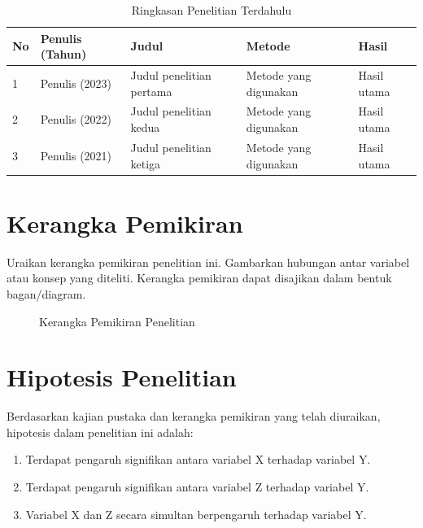 \begin{table}[H]
\caption{Ringkasan Penelitian Terdahulu}
\label{tab:penelitian-terdahulu}
\begin{isitable}
\begin{tabular}{p{0.5cm} p{3cm} p{4cm} p{4cm} p{2.5cm}}
\toprule
\textbf{No} & \textbf{Penulis (Tahun)} & \textbf{Judul} & \textbf{Metode} & \textbf{Hasil} \\
\midrule
1 & Penulis (2023) & Judul penelitian pertama & Metode yang digunakan & Hasil utama \\
2 & Penulis (2022) & Judul penelitian kedua & Metode yang digunakan & Hasil utama \\
3 & Penulis (2021) & Judul penelitian ketiga & Metode yang digunakan & Hasil utama \\
\bottomrule
\end{tabular}
\end{isitable}
\end{table}

\section{Kerangka Pemikiran}
\label{sec:kerangka-pemikiran}

Uraikan kerangka pemikiran penelitian ini. Gambarkan hubungan antar variabel atau
konsep yang diteliti. Kerangka pemikiran dapat disajikan dalam bentuk bagan/diagram.

\begin{figure}[H]
\centering
\caption{Kerangka Pemikiran Penelitian}
\label{fig:kerangka-pemikiran}
\end{figure}

\section{Hipotesis Penelitian}
\label{sec:hipotesis}

Berdasarkan kajian pustaka dan kerangka pemikiran yang telah diuraikan, hipotesis
dalam penelitian ini adalah:

\begin{enumerate}
  \item[\textbf{H\textsubscript{1}}:] Terdapat pengaruh signifikan antara variabel X terhadap variabel Y.
  \item[\textbf{H\textsubscript{2}}:] Terdapat pengaruh signifikan antara variabel Z terhadap variabel Y.
  \item[\textbf{H\textsubscript{3}}:] Variabel X dan Z secara simultan berpengaruh terhadap variabel Y.
\end{enumerate}
